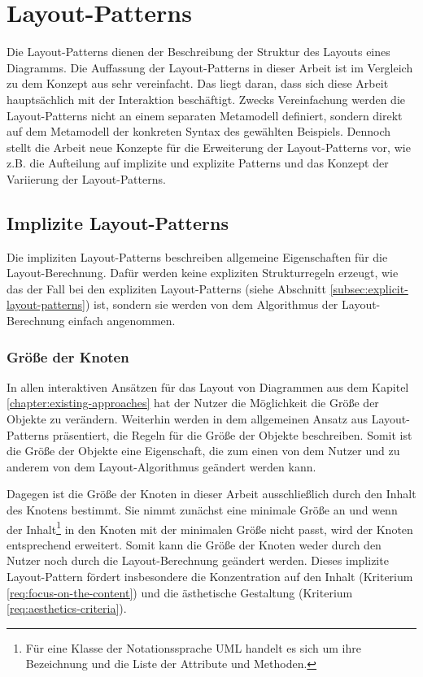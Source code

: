 
\section{Layout-Patterns}
\label{sec:layout-patterns}

Die Layout-Patterns dienen der Beschreibung der Struktur des Layouts eines Diagramms. Die Auffassung der Layout-Patterns in dieser Arbeit ist im Vergleich zu dem Konzept aus \cite{Maier12A-Pattern-based} sehr vereinfacht. Das liegt daran, dass sich diese Arbeit hauptsächlich mit der Interaktion beschäftigt. Zwecks Vereinfachung werden die Layout-Patterns nicht an einem separaten Metamodell definiert, sondern direkt auf dem Metamodell der konkreten Syntax des gewählten Beispiels. Dennoch stellt die Arbeit neue Konzepte für die Erweiterung der Layout-Patterns vor, wie z.B. die Aufteilung auf implizite und explizite Patterns und das Konzept der Variierung der Layout-Patterns.

\subsection{Implizite Layout-Patterns}
\label{subsec:implicit-layout-patterns}

Die impliziten Layout-Patterns beschreiben allgemeine Eigenschaften für die Layout-Berechnung. Dafür werden keine expliziten Strukturregeln erzeugt, wie das der Fall bei den expliziten Layout-Patterns (siehe Abschnitt \ref{subsec:explicit-layout-patterns}) ist, sondern sie werden von dem Algorithmus der Layout-Berechnung einfach angenommen.

\subsubsection{Größe der Knoten}

In allen interaktiven Ansätzen für das Layout von Diagrammen aus dem Kapitel \ref{chapter:existing-approaches} hat der Nutzer die Möglichkeit die Größe der Objekte zu verändern. Weiterhin werden in dem allgemeinen Ansatz aus \cite{Maier12A-Pattern-based} Layout-Patterns präsentiert, die Regeln für die Größe der Objekte beschreiben. Somit ist die Größe der Objekte eine Eigenschaft, die zum einen von dem Nutzer und zu anderem von dem Layout-Algorithmus geändert werden kann.

Dagegen ist die Größe der Knoten in dieser Arbeit ausschließlich durch den Inhalt des Knotens bestimmt. Sie nimmt zunächst eine minimale Größe an und wenn der Inhalt\footnote{Für eine Klasse der Notationssprache UML handelt es sich um ihre Bezeichnung und die Liste der Attribute und Methoden.} in den Knoten mit der minimalen Größe nicht passt, wird der Knoten entsprechend erweitert. Somit kann die Größe der Knoten weder durch den Nutzer noch durch die Layout-Berechnung geändert werden. Dieses implizite Layout-Pattern fördert insbesondere die Konzentration auf den Inhalt (Kriterium \ref{req:focus-on-the-content}) und die ästhetische Gestaltung (Kriterium \ref{req:aesthetics-criteria}).

